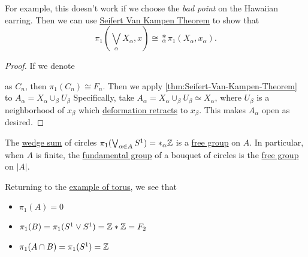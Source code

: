 \begin{eg}
\begin{enumerate}
\begin{exercise}
			      \par For example, this doesn't work if we choose the \emph{bad point} on the Hawaiian earring. Then we can use \hyperref[thm:Seifert-Van-Kampen-Theorem]{Seifert Van Kampen Theorem}
			      to show that
			      \[
				      \pi _1\left(\bigvee_\alpha X_\alpha , x\right) \cong \underset{\alpha }{\ast}\pi _1\left(X_\alpha , x_\alpha \right).
			      \]
			      \begin{proof}
				      If we denote
				      \begin{figure}[H]
					      \centering
					      \label{fig:eg-2:Seifert-Van-Kampen-Theorem}
				      \end{figure}
				      as \(C_n\), then \(\pi _1(C_n)\cong F_n\). Then we apply \autoref{thm:Seifert-Van-Kampen-Theorem} to \(A_\alpha = X_\alpha \cup_{\beta }U_\beta \)
				      Specifically, take \(A_\alpha = X_\alpha \cup_\beta U_\beta \simeq X_\alpha \), where \(U_\beta \) is a neighborhood of \(x_\beta \) which
				      \hyperref[def:deformation-retraction]{deformation retracts} to \(x_\beta \). This makes \(A_\alpha \) open as desired.
			      \end{proof}
		      \end{exercise}

		      \begin{corollary}
			      The \hyperref[sssec:Wedge-sum]{wedge sum} of circles \(\pi _1(\bigvee_{\alpha \in A}S^1) = \ast_\alpha \mathbb{\MakeUppercase{z}} \) is a \hyperref[def:free-group]{free group} on \(A\).
			      In particular, when \(A\) is finite, the \hyperref[def:fundamental-group]{fundamental group} of a bouquet of circles is the \hyperref[def:free-group]{free group}
			      on \(\left\vert A \right\vert \).
		      \end{corollary}

		      \hr
		      Returning to the \hyperref[lec11:eg:torus]{example of torus}, we see that
		      \begin{itemize}
			      \item \(\pi _1(A) = 0\)
			      \item \(\pi _1(B) = \pi _1(S^1\vee S^1) = \mathbb{\MakeUppercase{z}} \ast \mathbb{\MakeUppercase{z}}  = F_2\)
			      \item \(\pi _1(A\cap B) = \pi _1(S^1) = \mathbb{\MakeUppercase{z}} \)
		      \end{itemize}


\end{enumerate}
\end{eg}
